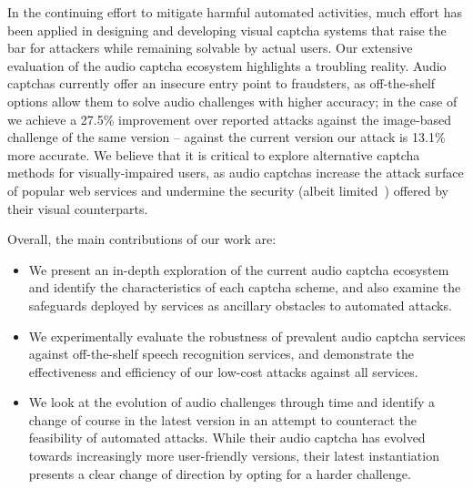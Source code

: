 In the continuing effort to mitigate harmful automated activities, much effort has been applied in 
designing and developing visual captcha systems that raise the bar for attackers while remaining 
solvable by actual users. Our extensive evaluation of the audio captcha ecosystem highlights
a troubling reality. Audio captchas currently offer an insecure entry point to fraudsters,
as off-the-shelf options allow them to solve audio challenges with higher accuracy; in the case of \re
we achieve a 27.5\% improvement over reported attacks against the image-based challenge of the same version --
against the current version our attack is 13.1\% more accurate.
We believe that it is critical to explore alternative captcha methods for visually-impaired users,
as audio captchas increase the attack surface of popular web services and undermine the security
(albeit limited~\cite{185128,sivakorn:eurosp16}) offered by their visual counterparts.

Overall, the main contributions of our work are:

\begin{itemize}

\item We present an in-depth exploration of the current audio captcha ecosystem and identify the characteristics 
of each captcha scheme, and also examine the safeguards deployed by services as ancillary obstacles to automated
attacks.

\item We experimentally evaluate the robustness of prevalent audio captcha services against
off-the-shelf speech recognition services, and demonstrate the effectiveness and efficiency 
of our low-cost attacks against all services.

\item We look at the evolution of \re audio challenges through time
 and identify a change of course in the latest version %
 in an attempt to counteract the feasibility of automated attacks. While 
 their audio captcha has evolved towards increasingly more user-friendly versions,
 their latest instantiation presents a clear change of direction by 
 opting for a harder challenge.


\end{itemize}
